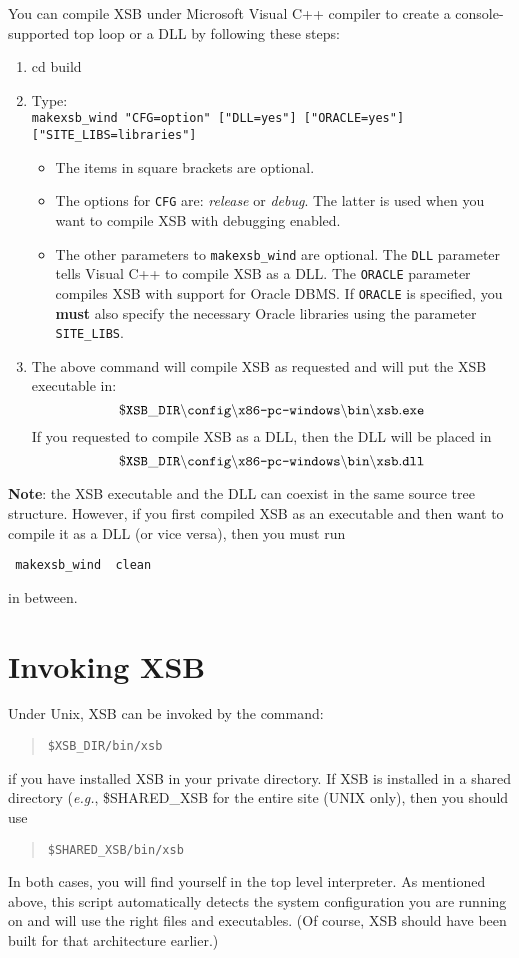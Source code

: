 You can compile XSB under Microsoft Visual C++ compiler 
to create a console-supported top loop or a DLL by following
these steps:

\begin{enumerate}

\item
   cd build

\item
  Type:\\
  {\tt makexsb\_wind "CFG=option" ["DLL=yes"] ["ORACLE=yes"] ["SITE\_LIBS=libraries"]}
  \begin{itemize}
  \item The items in square brackets are optional.
  \item The options for {\tt CFG} are: \emph{release} or \emph{debug}.  The
    latter is used when you want to compile XSB with debugging enabled.
  \item The other parameters to {\tt makexsb\_wind} are optional. The {\tt DLL}
    parameter tells Visual C++ to compile XSB as a DLL. The {\tt ORACLE}
    parameter compiles XSB with support for Oracle DBMS. If {\tt ORACLE} is
    specified, you {\bf must} also specify the necessary Oracle libraries
    using the parameter {\tt SITE\_LIBS}.
  \end{itemize}
   
 \item The above command will compile XSB as requested and will put the XSB 
   executable in:
\[
 \tt
 \$XSB\_DIR\backslash config\backslash \mbox{\tt x86-pc-windows}\backslash bin
 \backslash xsb.exe
\]
   If you requested to compile XSB as a DLL, then the DLL will be placed in
\[
 \tt
 \$XSB\_DIR\backslash config\backslash \mbox{\tt x86-pc-windows}\backslash
 bin \backslash xsb.dll
\]
\end{enumerate}
{\bf Note}: the XSB executable and the DLL can coexist in the same source
tree structure. However, if you first compiled  XSB as an executable and
then want to compile it as a DLL (or vice versa), then you must run 
\begin{verbatim}
 makexsb_wind  clean  
\end{verbatim}
in between.


\section{Invoking XSB}

Under Unix, XSB can be invoked by the command:
\begin{quote}
       \tt \$XSB\_DIR/bin/xsb
\end{quote}
if you have installed XSB in your private directory.
If XSB is installed in a shared directory ({\it e.g.}, \$SHARED\_XSB
for the entire site (UNIX only), then you should use
\begin{quote}
       \tt \$SHARED\_XSB/bin/xsb
\end{quote}
In both cases, you will find yourself in the top level interpreter.  
As mentioned above, this script automatically detects the system
configuration you are running on and will use the right files and
executables. (Of course, XSB should have been built for that architecture
earlier.)

